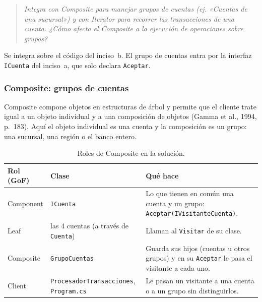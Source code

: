 \begingroup\sloppy

\begin{quote}
\itshape
Integra con Composite para manejar grupos de cuentas (ej. «Cuentas de una sucursal») y con
Iterator para recorrer las transacciones de una cuenta. ¿Cómo afecta el Composite a la
ejecución de operaciones sobre grupos?
\end{quote}

Se integra sobre el código del inciso~b. El grupo de cuentas entra por la interfaz
\texttt{ICuenta} del inciso~a, que solo declara \texttt{Aceptar}.

\subsubsection{Composite: grupos de cuentas}

Composite compone objetos en estructuras de árbol y permite que el cliente trate igual a un
objeto individual y a una composición de objetos (Gamma et al., 1994, p.~183). Aquí el objeto
individual es una cuenta y la composición es un grupo: una sucursal, una región o el banco
entero.

\begin{table}[H]
\centering
\small
\begin{tabularx}{\textwidth}{>{\raggedright\arraybackslash}p{2.1cm}
                             >{\raggedright\arraybackslash}p{4.6cm}
                             >{\raggedright\arraybackslash}X}
\toprule
\textbf{Rol (GoF)} & \textbf{Clase} & \textbf{Qué hace} \\
\midrule
Component & \texttt{ICuenta} & Lo que tienen en común una cuenta y un grupo:
  \texttt{Aceptar(IVisitanteCuenta)}. \\
\addlinespace
Leaf & las 4 cuentas (a través de \texttt{Cuenta}) & Llaman al \texttt{Visitar} de su clase. \\
\addlinespace
Composite & \texttt{GrupoCuentas} & Guarda sus hijos (cuentas u otros grupos) y en su
  \texttt{Aceptar} le pasa el visitante a cada uno. \\
\addlinespace
Client & \texttt{ProcesadorTransacciones}, \texttt{Program.cs} & Le pasan un visitante a una
  cuenta o a un grupo sin distinguirlos. \\
\bottomrule
\end{tabularx}
\caption{Roles de Composite en la solución.}
\end{table}

